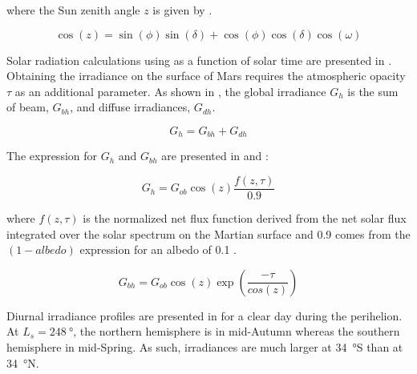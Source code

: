 where the Sun zenith angle $z$ is given by .

\begin{equation}
  \label{eq:cosz}
  \cos{(z)} = \sin{(\phi)}\sin{(\delta)} + \cos{(\phi)}\cos{(\delta)}\cos{(\omega)}
\end{equation}

Solar radiation calculations using  as a function of solar time are presented in . Obtaining the irradiance on the surface of Mars requires the atmospheric opacity $\tau$ as an additional parameter. As shown in , the global irradiance $G_{h}$ is the sum of beam, $G_{bh}$, and diffuse irradiances, $G_{dh}$.

\begin{equation}
  \label{eq:G_h_1}
  G_{h} = G_{bh} + G_{dh}
\end{equation}

The expression for $G_{h}$ and $G_{bh}$ are presented in  and :

\begin{equation}
  \label{eq:G_h_2}
  G_{h} = G_{ob}\cos{(z)}\frac{f(z,\tau)}{0.9}
\end{equation}

where $f(z,\tau)$ is the normalized net flux function derived from the net solar flux integrated over the solar spectrum on the Martian surface and 0.9 comes from the $(1-albedo)$ expression for an albedo of 0.1 .

\begin{equation}
  \label{eq:G_bh}
  G_{bh} = G_{ob}\cos{(z)}\exp\left(\frac{-\tau}{cos{(z)}}\right)
\end{equation}

Diurnal irradiance profiles are presented in  for a clear day during the perihelion. At $L_{s} = \SI{248}{\degree}$, the northern hemisphere is in mid-Autumn whereas the southern hemisphere in mid-Spring. As such, irradiances are much larger at \SI{34}{\degree}S than at \SI{34}{\degree}N.

